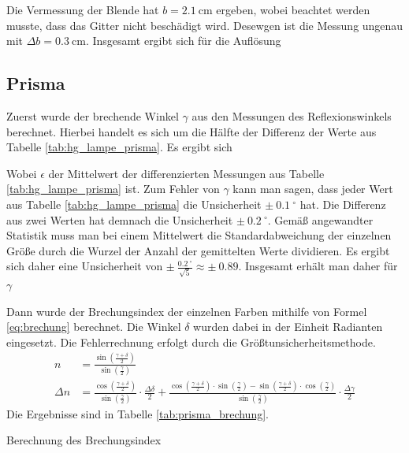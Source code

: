 \documentclass{article}
\begin{document}
Die Vermessung der Blende hat $b=2.1~$cm ergeben, wobei beachtet werden musste, dass das Gitter nicht beschädigt wird. Desewgen ist die Messung ungenau mit $\Delta b = 0.3~$cm.
Insgesamt ergibt sich für die Auflösung



\subsection{Prisma}

Zuerst wurde der brechende Winkel $\gamma$ aus den Messungen des Reflexionswinkels berechnet. Hierbei handelt es sich um die Hälfte der Differenz der Werte aus Tabelle \ref{tab:hg_lampe_prisma}. Es ergibt sich 

Wobei $\epsilon$ der Mittelwert der differenzierten Messungen aus Tabelle \ref{tab:hg_lampe_prisma} ist. Zum Fehler von $\gamma$ kann man sagen, dass jeder Wert aus Tabelle \ref{tab:hg_lampe_prisma} die Unsicherheit $\pm~0.1~^\circ$ hat. Die Differenz aus zwei Werten hat demnach die Unsicherheit $\pm~0.2~^\circ$. Gemäß angewandter Statistik muss man bei einem Mittelwert die Standardabweichung der einzelnen Größe durch die Wurzel der Anzahl der gemittelten Werte dividieren. Es ergibt sich daher eine Unsicherheit von $\pm~\frac{0.2~^\circ}{\sqrt{5}} \approx \pm~0.89$. Insgesamt erhält man daher für $\gamma$







Dann wurde der Brechungsindex der einzelnen Farben mithilfe von Formel \eqref{eq:brechung} berechnet. Die Winkel $\delta$ wurden dabei in der Einheit Radianten eingesetzt. Die Fehlerrechnung erfolgt durch die Größtunsicherheitsmethode.
\begin{align*}
n &= \frac{\sin\left(\frac{\gamma + \delta}{2}\right)}{\sin\left(\frac{\gamma}{2}\right)} \\
\Delta n &= \frac{\cos\left(\frac{\gamma + \delta}{2}\right)}{\sin\left(\frac{\gamma}{2}\right)}\cdot \frac{\Delta \delta}{2} + \frac{\cos\left(\frac{\gamma + \delta}{2}\right)\cdot \sin\left(\frac{\gamma}{2}\right) - \sin\left(\frac{\gamma + \delta}{2}\right)\cdot \cos\left(\frac{\gamma}{2}\right)}{\sin\left(\frac{\gamma}{2}\right)} \cdot\frac{\Delta \gamma}{2}
\end{align*}
Die Ergebnisse sind in Tabelle \ref{tab:prisma_brechung}.


\begin{table}[H]
\caption{Berechnung des Brechungsindex}
\label{tab:prisma_brechung}
\centering

\end{table}
\end{document}
